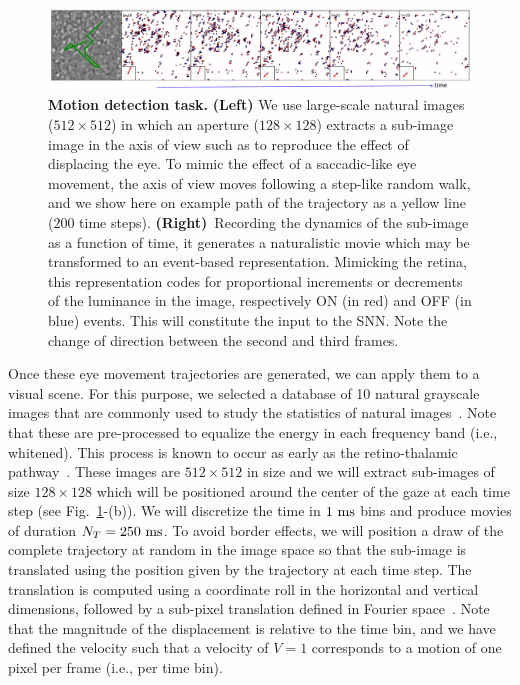 \documentclass[default]{sn-jnl}%
\theoremstyle{thmstyleone}%
\theoremstyle{thmstyletwo}%
\theoremstyle{thmstylethree}%
\newcommand{\seeFig}[1]{see Fig.~\ref{fig:#1}}%
\begin{document}
\begin{figure}%
    \centering
    \includegraphics[width=0.95\linewidth]{figures/motion_task.pdf}
    \caption{
    {\bf Motion detection task.} {\bf (Left)} We use large-scale natural images ($512\times512$) in which an aperture ($128\times128$) extracts a sub-image image in the axis of view  such as to reproduce the effect of displacing the eye. To mimic the effect of a saccadic-like eye movement, the axis of view moves following a step-like random walk, and we show here on example path of the trajectory as a yellow line ($200$ time steps). {\bf (Right)}~Recording the dynamics of the sub-image as a function of time, it generates a naturalistic movie which may be transformed to an event-based representation. Mimicking the retina, this representation codes for proportional increments or decrements of the luminance in the image, respectively ON (in red) and OFF (in blue) events. This will constitute the input to the SNN. Note the change of direction between the second and third frames.}
    \label{fig:motion_task}
\end{figure}
Once these eye movement trajectories are generated, we can apply them to a visual scene. For this purpose, we selected a database of 10 natural grayscale images that are commonly used to study the statistics of natural images~\citep{olshausen_emergence_1996}. Note that these are pre-processed to equalize the energy in each frequency band (i.e., whitened). This process is known to occur as early as the retino-thalamic pathway~\citep{dan_efficient_1996}. These images are $512 \times 512$ in size and we will extract sub-images of size $128 \times 128$ which will be positioned around the center of the gaze at each time step (\seeFig{motion_task}-(b)). We will discretize the time in $1~\si{\milli\second}$ bins and produce movies of duration $N_T = 250~\si{\milli\second}$. To avoid border effects, we will position a draw of the complete trajectory at random in the image space so that the sub-image is translated using the position given by the trajectory at each time step. The translation is computed using a coordinate roll in the horizontal and vertical dimensions, followed by a sub-pixel translation defined in Fourier space~\citep{perrinet_sparse_2015}. Note that the magnitude of the displacement is relative to the time bin, and we have defined the velocity such that a velocity of $V=1$ corresponds to a motion of one pixel per frame (i.e., per time bin).
\end{document}
